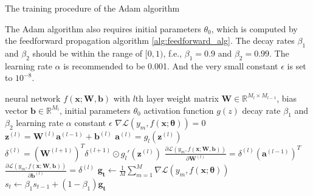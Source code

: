 \documentclass[
	parskip, 			   %
	twoside, 			   %
	DIV=14, 			   %
	BCOR=15.0mm, 		   %
	headsepline, 		   %
	open=right, 		   %
	captions=tableheading, %
	bibliography=totoc,    %
	numbers=noenddot       %
]{scrreprt}
\begin{document}
\clearpage
\begin{algorithm}[h!]
\caption{The training procedure of the Adam algorithm}
The Adam algorithm also requires initial parameters $\theta_{0}$, which is computed by the feedforward propagation algorithm \ref{alg:feedforward_alg}. The decay rates $\beta_1$ and $\beta_2$ should be within the range of $[0,1)$, f.e., $\beta_1=0.9$ and $\beta_2=0.99$. The learning rate $\alpha$ is recommended to be 0.001. And the very small constant $\epsilon$ is set to $10^{-8}$.
\label{alg:Adam_alg}
    \begin{algorithmic}
    \Require neural network $f(\mathbf{x};\mathbf{W},\mathbf{b})$ with $l$th layer
    \Require weight matrix $\mathbf{W} \in \mathbb{R}^{M_{l} \times M_{l-1}}$, bias vector $\mathbf{b} \in \mathbb{R}^{M_{l}}$, initial parameters $\theta_{0}$
    \Require activation function $g(z)$
    \Require decay rate $\beta_1$ and $\beta_2$
    \Require learning rate $\alpha$
    \Require constant $\epsilon$
    \Ensure $\nabla \mathcal{L}\left( y_{m},f(\mathbf{x};\mathbf{\theta}) \right) = 0$
            \State $\mathbf{z}^{(l)} = \mathbf{W}^{(l)} \mathbf{a}^{(l-1)} + \mathbf{b}^{(l)}$ 
            \State $\mathbf{a}^{(l)} = g_{l}(\mathbf{z}^{(l)})$ 
            \State {}
            \State $\delta^{(l)} = (\mathbf{W}^{(l+1)})^T \delta^{(l+1)} \odot g_{l}'(\mathbf{z}^{(l)})$ 
            \State {}
            \State $\frac{\partial \mathcal{L}\left( y_m,f(\mathbf{x};\mathbf{\mathbf{W},\mathbf{b}}) \right)}{\partial \mathbf{W}^{(l)}} = \delta^{(l)} (\mathbf{a}^{(l-1)})^T$ 
            \State $\frac{\partial \mathcal{L}\left( y_m,f(\mathbf{x};\mathbf{\mathbf{W},\mathbf{b}}) \right)}{\partial \mathbf{b}^{(l)}} = \delta^{(l)}$ 
            \State {}
        \EndFor
    \EndFor
    \State $\mathbf{g_t} \gets \frac{1}{M} \sum\nolimits_{m=1}^M \nabla \mathcal{L}\left( y_{m},f(\mathbf{x};\mathbf{\theta}) \right)$ 
    \State $s_t \gets \beta_1 s_{t-1} + (1-\beta_1) \mathbf{g_t}$ 

\end{algorithmic}
\end{algorithm}
\end{document}
